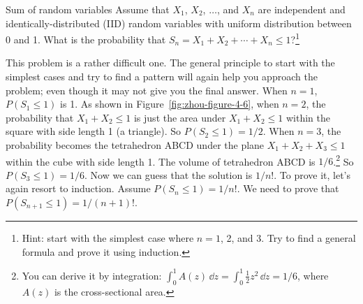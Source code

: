 \begin{problem}{Sum of random variables}
Assume that $X_1$, $X_2$, $\ldots$, and $X_n$ are independent and
identically-distributed (IID) random variables with uniform distribution between 0 and 1.
What is the probability that $S_n=X_1+X_2+\cdots+X_n\leq1$?\footnote[28]{Hint: start with
the simplest case where $n=1$, 2, and 3. Try to find a general formula and prove it using
induction.}


\end{problem}
\begin{solution}
This problem is a rather difficult one. The general principle to start with the simplest
cases and try to find a pattern will again help you approach the problem; even though it
may not give you the final answer. When $n=1$, $P(S_1\leq1)$ is 1. As shown in
Figure~\ref{fig:zhou-figure-4-6}, when $n=2$, the probability that $X_1+X_2\leq1$ is
just the area under $X_1+X_2\leq1$ within the square with side length 1 (a triangle). So
$P(S_2\leq1)=1/2$. When $n=3$, the probability becomes the tetrahedron ABCD under the
plane $X_1+X_2+X_3\leq1$ within the cube with side length 1. The volume of tetrahedron
ABCD is $1/6$.\footnote[29]{You can derive it by integration:
$\int_0^1 A(z)\,\dd z=\int_0^1\frac{1}{2}z^2\,\dd z=1/6$, where $A(z)$ is the cross-sectional
area.} So $P(S_3\leq1)=1/6$. Now we can guess that the solution is $1/n!$. To prove it,
let's again resort to induction. Assume $P(S_n\leq1)=1/n!$. We need to prove that
$P(S_{n+1}\leq1)=1/(n+1)!$.


\end{solution}
